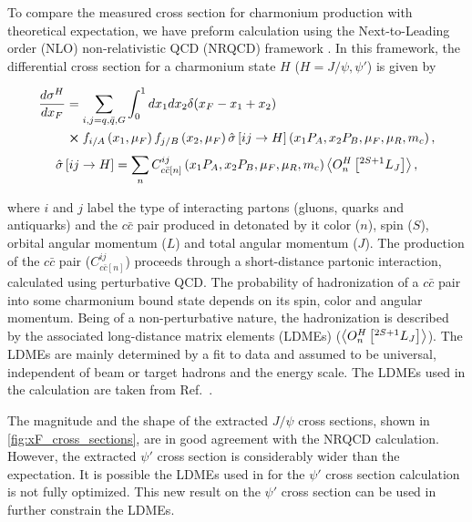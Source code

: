 \documentclass[reprint,aps,unsortedaddress,superscriptaddress,prd,floatfix,showpacs,linenumbers]{revtex4-2}
\begin{document}
To compare the measured cross section for charmonium
production with theoretical expectation, we have preform calculation
using the Next-to-Leading order (NLO) non-relativistic QCD (NRQCD)
framework \cite{bodwin1995}. In this framework, the differential cross section
for a charmonium state $H$ ($H=J/\psi, \psi'$) is given by
\begin{widetext}
	\begin{equation}
		\begin{split}
			\frac{d\sigma^H}{dx_F} &=\sum_{i,j = q,\bar{q},G}\int^1_0 dx_1 dx_2 \delta(x_F-x_1+x_2)\\
			&\cross f_{i/A}\left(x_1,\mu_F\right)f_{j/B}\left(x_2,\mu_F\right)\hat{\sigma}\left[ij\rightarrow H\right]\left(x_1P_A,x_2P_B,\mu_F,\mu_R , m_c\right),
		\end{split}
	\end{equation}
	\begin{equation}
		\hat{\sigma}\left[ij\rightarrow H\right]= \sum_n C^{ij}_{c\bar{c}\left[n\right]}\left(x_1P_A,x_2P_B,\mu_F,\mu_R , m_c\right)\expval{O^H_n \left[^{2S+1}L_J\right]},
	\end{equation}
\end{widetext}
where $i$ and $j$ label the type of interacting partons (gluons, quarks and antiquarks)
and the $c\bar{c}$ pair produced in detonated by it color ($n$), spin ($S$),
orbital angular momentum ($L$) and total angular momentum ($J$).
The production of the $c\bar{c}$ pair ($C^{ij}_{c\bar{c}\left[n\right]}$) proceeds
through a short-distance partonic interaction, calculated using perturbative QCD.
The probability of hadronization of a $c\bar{c}$ pair into some charmonium bound
state depends on its spin, color and angular momentum.
Being of a non-perturbative nature, the hadronization is described by the associated
long-distance matrix elements (LDMEs) ($\expval{O^H_n \left[^{2S+1}L_J\right]}$).
The LDMEs are mainly determined by a fit to data and assumed to be universal, independent of beam or target hadrons and the energy scale. The LDMEs used in the calculation are taken from Ref.~\cite{hsieh2021}.

The magnitude and the shape of the extracted $J/\psi$ cross sections,
shown in \cref{fig:xF_cross_sections}, are in good agreement with the NRQCD calculation.
However, the extracted $\psi'$ cross section is considerably wider than the expectation.
It is possible the LDMEs used in for the $\psi'$ cross section calculation is not fully optimized.
This new result on the $\psi'$ cross section can be used in further constrain the LDMEs.
\end{document}
